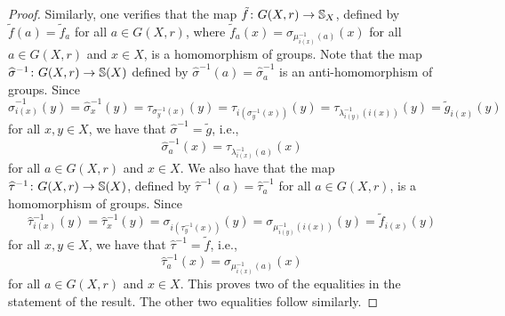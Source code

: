 \begin{lemma}
\begin{proof}
		Similarly, one verifies that the map $\tilde{f}\colon G(X,r)\to\mathbb{S}_X$, defined by $\tilde{f}(a)=\tilde{f}_a$ for all $a\in G(X,r)$,
		where $\tilde{f}_a(x)=\sigma_{\mu_{i(x)}^{-1}(a)}(x)$ for all $a\in G(X,r)$ and $x\in X$, is a homomorphism of groups.
		Note that the map $\widehat{\sigma}^{-1}\colon G(X,r)\to\mathbb{S}(X)$ defined by $\widehat{\sigma}^{-1}(a)=\widehat{\sigma}_a^{-1}$ is an anti-homomorphism
		of groups. Since 
		\[\widehat{\sigma}_{i(x)}^{-1}(y)=\widehat{\sigma}_{x}^{-1}(y)=\tau_{\sigma_{y}^{-1}(x)}(y)=\tau_{i(\sigma_{y}^{-1}(x))}(y)=\tau_{\lambda_{i(y)}^{-1}(i(x))}(y)=\tilde{g}_{i(x)}(y)\] for all $x,y\in X$, we have that
		$\widehat{\sigma}^{-1}=\tilde{g}$, i.e., 
		\[\widehat{\sigma}_a^{-1}(x)=\tau_{\lambda_{i(x)}^{-1}(a)}(x)\] for all $a\in G(X,r)$
		and $x\in X$. We also have that the map $\widehat{\tau}^{-1}\colon G(X,r)\to\mathbb{S}(X)$, defined by $\widehat{\tau}^{-1}(a)=\widehat{\tau}_a^{-1}$ for all $a\in G(X,r)$, is a homomorphism
		of groups. Since 
		\[\widehat{\tau}_{i(x)}^{-1}(y)=\widehat{\tau}_{x}^{-1}(y)=\sigma_{i(\tau_{y}^{-1}(x))}(y)=\sigma_{\mu_{i(y)}^{-1}(i(x))}(y)=\tilde{f}_{i(x)}(y)\] for all $x,y\in X$, we have that
		$\widehat{\tau}^{-1}=\tilde{f}$, i.e., \[\widehat{\tau}_a^{-1}(x)=\sigma_{\mu_{i(x)}^{-1}(a)}(x)\] for all $a\in G(X,r)$ and
		$x\in X$. This proves two of the equalities in the statement of the result. The other two equalities follow similarly. 
 	\end{proof}
\end{lemma}

